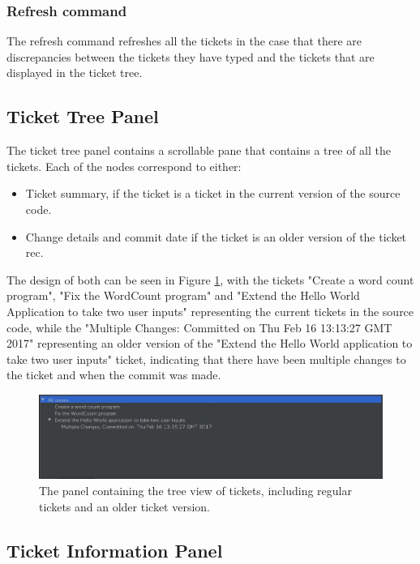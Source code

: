 \documentclass{4thYearProject}
\begin{document}

\subsubsection{Refresh command}

The refresh command refreshes all the tickets in the case that there are discrepancies between the tickets they have typed and the tickets that are displayed in the ticket tree.

\subsection{Ticket Tree Panel}

The ticket tree panel contains a scrollable pane that contains a tree of all the tickets. Each of the nodes correspond to either:
\begin{itemize}
\item Ticket summary, if the ticket is a ticket in the current version of the source code. 
\item Change details and commit date if the ticket is an older version of the ticket rec. 
\end{itemize}

The design of both can be seen in Figure \ref{fig:tasktree}, with the tickets "Create a word count program", "Fix the WordCount program" and "Extend the Hello World Application to take two user inputs" representing the current tickets in the source code, while the "Multiple Changes: Committed on Thu Feb 16 13:13:27 GMT 2017" representing an older version of the "Extend the Hello World application to take two user inputs" ticket, indicating that there have been multiple changes to the ticket and when the commit was made. 

\begin{figure}[H]
\includegraphics[scale=0.6]{Task_tree_all}
\centering
\caption{The panel containing the tree view of tickets, including regular tickets and an older ticket version.}
\label{fig:tasktree}
\end{figure}

\subsection{Ticket Information Panel}
\end{document}

